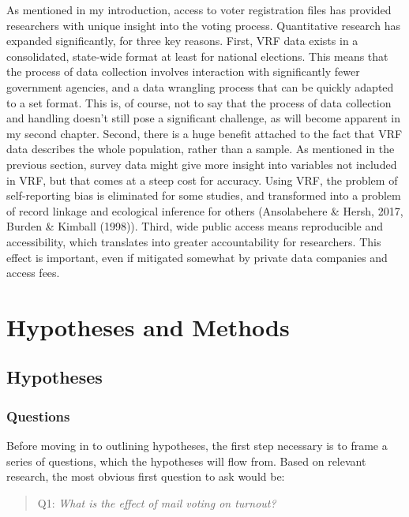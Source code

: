 \documentclass[12pt,twoside]{reedthesis}
\begin{document}
  As mentioned in my introduction, access to voter registration files has
  provided researchers with unique insight into the voting process.
  Quantitative research has expanded significantly, for three key reasons.
  First, VRF data exists in a consolidated, state-wide format at least for
  national elections. This means that the process of data collection
  involves interaction with significantly fewer government agencies, and a
  data wrangling process that can be quickly adapted to a set format. This
  is, of course, not to say that the process of data collection and
  handling doesn't still pose a significant challenge, as will become
  apparent in my second chapter. Second, there is a huge benefit attached
  to the fact that VRF data describes the whole population, rather than a
  sample. As mentioned in the previous section, survey data might give
  more insight into variables not included in VRF, but that comes at a
  steep cost for accuracy. Using VRF, the problem of self-reporting bias
  is eliminated for some studies, and transformed into a problem of record
  linkage and ecological inference for others (Ansolabehere \& Hersh,
  2017, Burden \& Kimball (1998)). Third, wide public access means
  reproducible and accessibility, which translates into greater
  accountability for researchers. This effect is important, even if
  mitigated somewhat by private data companies and access fees.
  
  \chapter{Hypotheses and Methods}\label{hypotheses-and-methods}
  
  \section{Hypotheses}\label{hypotheses}
  
  \subsection{Questions}\label{questions}
  
  Before moving in to outlining hypotheses, the first step necessary is to
  frame a series of questions, which the hypotheses will flow from. Based
  on relevant research, the most obvious first question to ask would be:
  
  \begin{quotation}
  Q1: \textit{What is the effect of mail voting on turnout?}
  \end{quotation}
  
\end{document}
